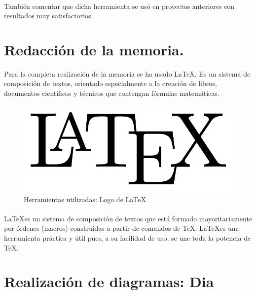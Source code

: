 \paragraph{}
También comentar que dicha herramienta se usó en proyectos anteriores con resultados muy satisfactorios.

\section{Redacción de la memoria.}

\paragraph{}
Para la completa realización de la memoria se ha usado \LaTeX. Es un sistema de composición de textos, orientado 
especialmente a la creación de libros, documentos científicos y técnicos que contengan fórmulas matemáticas.

\begin{figure}[H]
  \label{logo_latex}
  \begin{center}
    \includegraphics[scale=0.25]{imagenes/logo_latex.png}
  \end{center}
  \caption{Herramientas utilizadas: Logo de \LaTeX}
\end{figure}

\paragraph{}
\LaTeX es un sistema de composición de textos que está formado mayoritariamente por órdenes (macros) construidas a partir de 
comandos de TeX. \LaTeX es una herramienta práctica y útil pues, a su facilidad de uso, se une toda la potencia de TeX.

\section{Realización de diagramas: Dia}

